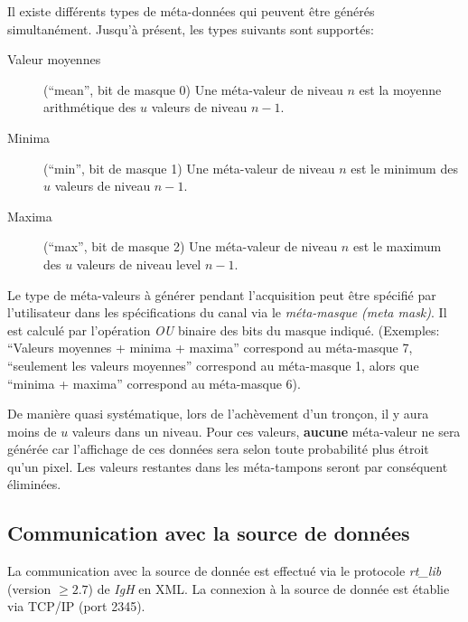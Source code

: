 \documentclass[a4paper,12pt,BCOR6mm,bibtotoc,idxtotoc]{scrbook}
\begin{document}
Il existe diff\'erents types de m\'eta-donn\'ees qui
peuvent \^etre g\'en\'er\'es simultan\'ement.
Jusqu'\`a pr\'esent, les types suivants sont support\'es:

\begin{description}

\item[Valeur moyennes] (``mean'', bit de masque 0) Une m\'eta-valeur
  de niveau $n$ est la moyenne arithm\'etique des $u$ valeurs de niveau
  $n - 1$.

\item[Minima] (``min'', bit de masque 1) Une m\'eta-valeur de niveau
  $n$ est le minimum des $u$ valeurs de niveau $n - 1$.

\item[Maxima] (``max'', bit de masque 2) Une m\'eta-valeur de niveau
  $n$ est le maximum des $u$ valeurs de niveau level $n - 1$.

\end{description}

Le type de m\'eta-valeurs \`a g\'en\'erer pendant l'acquisition peut
\^etre sp\'ecifi\'e par l'utilisateur dans les sp\'ecifications du canal
via le \textit{m\'eta-masque (meta mask)}. Il est
calcul\'e par l'opération \textit{OU} binaire des bits du masque
indiqu\'e.  (Exemples: ``Valeurs moyennes + minima + maxima''
correspond au m\'eta-masque 7, ``seulement les valeurs moyennes''
correspond au m\'eta-masque 1, alors que ``minima + maxima'' correspond
au m\'eta-masque 6).

De mani\`ere quasi syst\'ematique, lors de l'ach\`evement d'un tron\c
con, il y aura moins de $u$ valeurs dans un niveau.  Pour
ces valeurs, \textbf{aucune} m\'eta-valeur ne sera g\'en\'er\'ee car
l'affichage de ces donn\'ees sera selon toute probabilit\'e plus
\'etroit qu'un pixel.  Les valeurs restantes dans les m\'eta-tampons
seront par cons\'equent \'elimin\'ees.




\subsection{Communication avec la source de donn\'ees}
\label{sec:dlsd_logger_comm}

La communication avec la source de donn\'ee est effectu\'e via le
protocole \textit{rt\_lib} (version \textit{$\ge 2.7$}) de
\textit{IgH} en XML. La connexion \`a la source de donn\'ee
est \'etablie via TCP/IP (port 2345).
\end{document}
